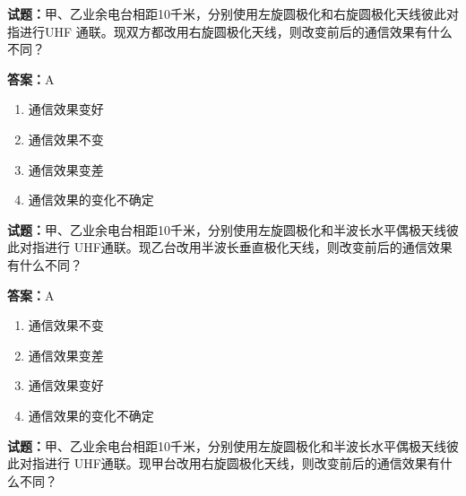 \documentclass{ctexbook}
\begin{document}




\vspace{1em}

\textbf{试题：}甲、乙业余电台相距10千米，分别使用左旋圆极化和右旋圆极化天线彼此对指进行UHF
通联。现双方都改用右旋圆极化天线，则改变前后的通信效果有什么不同？ 

\textbf{答案：}A 

\begin{enumerate}[leftmargin=3em]
  \item 通信效果变好 

  \item 通信效果不变 

  \item 通信效果变差 

  \item 通信效果的变化不确定 

\end{enumerate}





\vspace{1em}

\textbf{试题：}甲、乙业余电台相距10千米，分别使用左旋圆极化和半波长水平偶极天线彼此对指进行
UHF通联。现乙台改用半波长垂直极化天线，则改变前后的通信效果有什么不同？ 

\textbf{答案：}A 

\begin{enumerate}[leftmargin=3em]
  \item 通信效果不变 

  \item 通信效果变差 

  \item 通信效果变好 

  \item 通信效果的变化不确定 

\end{enumerate}





\vspace{1em}

\textbf{试题：}甲、乙业余电台相距10千米，分别使用左旋圆极化和半波长水平偶极天线彼此对指进行
UHF通联。现甲台改用右旋圆极化天线，则改变前后的通信效果有什么不同？ 
\end{document}
